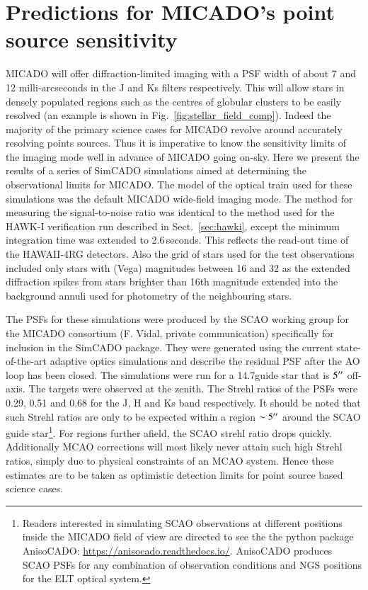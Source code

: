 \section{Predictions for MICADO's point source sensitivity}
\label{sec:micado}

MICADO will offer diffraction-limited imaging with a PSF width of about 7 and 12 milli-arcseconds in the J and Ks filters respectively.
This will allow stars in densely populated regions such as the centres of globular clusters to be easily resolved (an example is shown in Fig.~\ref{fig:stellar_field_comp}).
Indeed the majority of the primary science cases for MICADO revolve around accurately resolving points sources.
Thus it is imperative to know the sensitivity limits of the imaging mode well in advance of MICADO going on-sky.
Here we present the results of a series of SimCADO simulations aimed at determining the observational limits for MICADO.
The model of the optical train used for these simulations was the default MICADO wide-field imaging mode.
The method for measuring the signal-to-noise ratio was identical to the method used for the HAWK-I verification run described in Sect.~\ref{sec:hawki}, except the minimum integration time was extended to 2.6\,seconds.
This reflects the read-out time of the HAWAII-4RG detectors.
Also the grid of stars used for the test observations included only stars with (Vega) magnitudes between 16 and 32 as the extended diffraction spikes from stars brighter than 16th magnitude extended into the background annuli used for photometry of the neighbouring stars.

The PSFs for these simulations were produced by the SCAO working group for the MICADO consortium (F. Vidal, private communication) specifically for inclusion in the SimCADO package.
They were generated using the current state-of-the-art adaptive optics simulations and describe the residual PSF after the AO loop has been closed.
The simulations were run for a 14.7\m guide star that is $5^{\prime\prime}$ off-axis.
The targets were observed at the zenith.
The Strehl ratios of the PSFs were 0.29, 0.51 and 0.68 for the J, H and Ks band respectively.
It should be noted that such Strehl ratios are only to be expected within a region $\sim5^{\prime\prime}$ around the SCAO guide star\footnote{Readers interested in simulating SCAO observations at different positions inside the MICADO field of view are directed to see the the python package AnisoCADO: \url{https://anisocado.readthedocs.io/}. AnisoCADO produces SCAO PSFs for any combination of observation conditions and NGS positions for the ELT optical system.}.
For regions further afield, the SCAO strehl ratio drops quickly.
Additionally MCAO corrections will most likely never attain such high Strehl ratios, simply due to physical constraints of an MCAO system.
Hence these estimates are to be taken as optimistic detection limits for point source based science cases.


